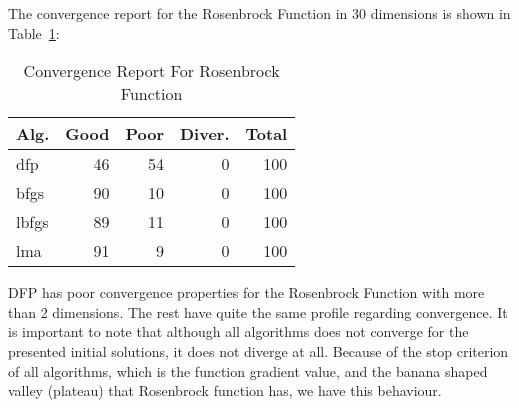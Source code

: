 
The convergence report for the Rosenbrock Function in 30 dimensions is shown in Table~\ref{convergence:rosenbrock4d}:

\begin{table}[H]
\centering
\caption{Convergence Report For Rosenbrock Function}
\label{convergence:rosenbrock4d}
\begin{tabular}{lrrrr}
\toprule
 Alg. &  Good &  Poor &  Diver. &  Total \\
\midrule
  dfp &    46 &    54 &       0 &    100 \\
 bfgs &    90 &    10 &       0 &    100 \\
lbfgs &    89 &    11 &       0 &    100 \\
  lma &    91 &     9 &       0 &    100 \\
\bottomrule
\end{tabular}
\end{table}

DFP has poor convergence properties for the Rosenbrock Function with more than 2 dimensions.
The rest have quite the same profile regarding convergence. It is important to note that
although all algorithms does not converge for the presented initial solutions, it does not
diverge at all. Because of the stop criterion of all algorithms, which is the function gradient value,
and the banana shaped valley (plateau) that Rosenbrock function has, we have this behaviour.